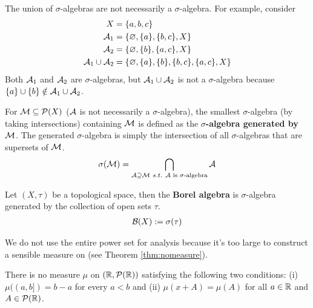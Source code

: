 \documentclass[11pt]{article}
\newcommand{\s}[0]{$\sigma$}
\begin{document}
	\begin{remark}
		The union of \s-algebras are not necessarily a \s-algebra. For example, consider
		\begin{align}
			X &= \{a, b, c\} \\
			\mathcal{{A}}_1 &= \{\varnothing, \{a\}, \{b, c\}, X\} \\
			\mathcal{{A}}_2 &= \{\varnothing, \{b\}, \{a, c\}, X\} \\
			\mathcal{{A}}_1 \cup \mathcal{{A}}_2 &= \{\varnothing, \{a\}, \{b\}, \{b, c\}, \{a, c\}, X\}
		\end{align}
		Both $\mathcal{{A}}_1$ and $\mathcal{{A}}_2$ are \s-algebras, but $\mathcal{{A}}_1 \cup \mathcal{{A}}_2$ is not a \s-algebra because $\{a\} \cup \{b\} \notin \mathcal{{A}}_1 \cup \mathcal{{A}}_2$.
	\end{remark}
	
	\begin{definition}
		For $\mathcal{{M}} \subseteq \mathcal{{P}}(X)$ ($\mathcal{{A}}$ is not necessarily a $\sigma$-algebra), the smallest $\sigma$-algebra (by taking intersections) containing $\mathcal{{M}}$ is defined as the \textbf{$\sigma$-algebra generated by $\mathcal{{M}}$}.
		The generated $\sigma$-algebra is simply the intersection of all $\sigma$-algebras that are supersets of $\mathcal{{M}}$.
		\begin{align}
			\sigma(\mc{M}) = \bigcap_{\mc{A} \supseteq \mc{M}\ s.t.\ \mc{A}\tx{ is $\sigma$-algebra}} \mc{A}
		\end{align}
	\end{definition}
	
	\begin{definition}
		Let $(X, \tau)$ be a topological space, then the \textbf{Borel algebra} is $\sigma$-algebra generated by the collection of open sets $\tau$.
		\begin{align}
			\mathcal{{B}}(X) := \sigma(\tau)
		\end{align}
	\end{definition}
	
	\begin{remark}
		We do not use the entire power set for analysis because it's too large to construct a sensible measure on (see Theorem \ref{thm:nomeasure}).
	\end{remark}
	
	\begin{theorem} \label{thm:nomeasure}
		There is no measure $\mu$ on $(\mathbb{R}, \mathcal{{P}}(\mathbb{R}))$ satisfying the following two conditions: (i) $\mu((a, b]) = b-a$ for every $a < b$ and (ii) $\mu(x+A) = \mu(A)$ for all $a \in \mathbb{R}$ and $A \in \mathcal{{P}}(\mathbb{R})$. 
	\end{theorem}
	
\end{document}
